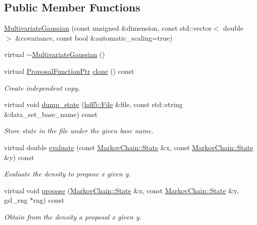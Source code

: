 \subsection*{Public Member Functions}
\begin{DoxyCompactItemize}
\item 
\hyperlink{classeos_1_1proposal__functions_1_1MultivariateGaussian_a9052192755db179db5e204c2bb0ad3f3}{MultivariateGaussian} (const unsigned \&dimension, const std::vector$<$ double $>$ \&covariance, const bool \&automatic\_\-scaling=true)
\item 
virtual \hyperlink{classeos_1_1proposal__functions_1_1MultivariateGaussian_a18dde9d78f6ec8a459443396648ee990}{$\sim$MultivariateGaussian} ()
\item 
virtual \hyperlink{namespaceeos_ae97f9891c67c90959a03fc96efaa4dc9}{ProposalFunctionPtr} \hyperlink{classeos_1_1proposal__functions_1_1MultivariateGaussian_abc989d0f246afe160eb1d4a0f1b4a03e}{clone} () const 
\begin{DoxyCompactList}\small\item\em Create independent copy. \item\end{DoxyCompactList}\item 
virtual void \hyperlink{classeos_1_1proposal__functions_1_1MultivariateGaussian_a5ab69304a64a9a947c847b8bc842417f}{dump\_\-state} (\hyperlink{classeos_1_1hdf5_1_1File}{hdf5::File} \&file, const std::string \&data\_\-set\_\-base\_\-name) const 
\begin{DoxyCompactList}\small\item\em Store state in the file under the given base name. \item\end{DoxyCompactList}\item 
virtual double \hyperlink{classeos_1_1proposal__functions_1_1MultivariateGaussian_a691b0b536abdd28e3cc629c27046603d}{evaluate} (const \hyperlink{structeos_1_1MarkovChain_1_1State}{MarkovChain::State} \&x, const \hyperlink{structeos_1_1MarkovChain_1_1State}{MarkovChain::State} \&y) const 
\begin{DoxyCompactList}\small\item\em Evaluate the density to propose x given y. \item\end{DoxyCompactList}\item 
virtual void \hyperlink{classeos_1_1proposal__functions_1_1MultivariateGaussian_a4f451b8dc78b681eee4bda462217fb77}{propose} (\hyperlink{structeos_1_1MarkovChain_1_1State}{MarkovChain::State} \&x, const \hyperlink{structeos_1_1MarkovChain_1_1State}{MarkovChain::State} \&y, gsl\_\-rng $\ast$rng) const 
\begin{DoxyCompactList}\small\item\em Obtain from the density a proposal x given y. \item\end{DoxyCompactList}\end{DoxyCompactItemize}
